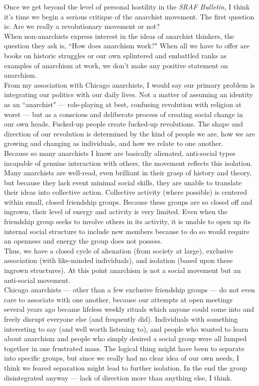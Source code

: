 \documentclass[12pt, onecolumn, letterpaper, oneside]{book}
\begin{document}
Once we get beyond the level of personal hostility in the \emph{SRAF Bulletin}, I think it's time we begin a serious critique of the anarchist movement. The first question is: Are we really a revolutionary movement or not?\\
When non-anarchists express interest in the ideas of anarchist thinkers, the question they ask is, ``How does anarchism work?" When all we have to offer are books on historic struggles or our own splintered and embattled ranks as examples of anarchism at work, we don't make any positive statement on anarchism.\\
From my association with Chicago anarchists, I would say our primary problem is integrating our politics with our daily lives. Not a matter of assuming an identity as an ``anarchist" --- role-playing at best, confusing revolution with religion at worst --- but as a conscious and deliberate process of creating social change in our own heads. Fucked-up people create fucked-up revolutions. The shape and direction of our revolution is determined by the kind of people we are, how we are growing and changing as individuals, and how we relate to one another.\\
Because so many anarchists I know are basically alienated, anti-social types incapable of genuine interaction with others, the movement reflects this isolation. Many anarchists are well-read, even brilliant in their grasp of history and theory, but because they lack event minimal social skills, they are unable to translate their ideas into collective action. Collective activity (where possible) is centered within small, closed friendship groups. Because these groups are so closed off and ingrown, their level of energy and activity is very limited. Even when the friendship group seeks to involve others in its activity, it is unable to open up its internal social structure to include new members because to do so would require an openness and energy the group does not possess.\\
Thus, we have a closed cycle of alienation (from society at large), exclusive association (with like-minded individuals), and isolation (based upon these ingrown structures). At this point anarchism is not a social movement but an anti-social movement.\\
Chicago anarchists --- other than a few exclusive friendship groups --- do not even care to associate with one another, because our attempts at open meetings several years ago became lifeless weekly rituals which anyone could come into and freely disrupt everyone else (and frequently did). Individuals with something interesting to say (and well worth listening to), and people who wanted to learn about anarchism and people who simply desired a social group were all lumped together in one frustrated mass. The logical thing might have been to separate into specific groups, but since we really had no clear idea of our own needs, I think we feared separation might lead to further isolation. In the end the group disintegrated anyway --- lack of direction more than anything else, I think.\\
\end{document}
